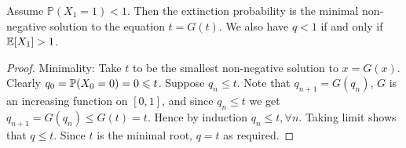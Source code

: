 \begin{theorem}
    Assume $ \mathbb{P}(X_1=1)<1 $. Then the extinction probability is the minimal non-negative solution to the equation $t=G(t)$. We also have $ q<1 $ if and only if $ {\mathbb{E}}[X_1]>1 $.
\end{theorem}
\begin{proof}
    Minimality: Take $t$ to be the smallest non-negative solution to $x=G(x)$. Clearly $ q_0={\mathbb{P}}(X_0=0)=0\leqslant t $. Suppose $ q_n\le t $. Note that $q_{n+1}=G(q_n)$, $G$ is an increasing function on $[0,1]$, and since $ q_n\le t $ we get $ q_{n+1}=G(q_n)\le G(t)=t $. Hence by induction $ q_n\le t,\forall n $. Taking limit shows that $ q\le t $. Since $t$ is the minimal root, $ q=t $ as required.
\end{proof}